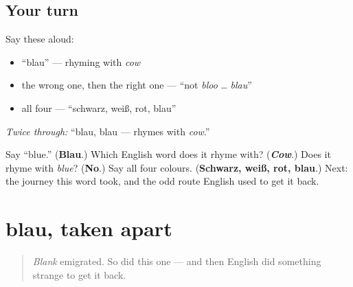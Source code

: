 \subsection*{Your turn}
Say these aloud:

\begin{itemize}
\raggedright
  \item \textquotedblleft{}blau\textquotedblright{} — rhyming with \emph{cow}
  \item the wrong one, then the right one — \textquotedblleft{}not \emph{bloo} … \emph{blau}\textquotedblright{}
  \item all four — \textquotedblleft{}schwarz, weiß, rot, blau\textquotedblright{}
\end{itemize}

\emph{Twice through:} \textquotedblleft{}blau, blau — rhymes with \emph{cow}.\textquotedblright{}

\begin{tcolorbox}[breakable,colback=teal!4,colframe=teal!35!black,title={Before you move on}]
Say \textquotedblleft{}blue.\textquotedblright{} (\textbf{Blau}.) Which English word does it rhyme with? (\emph{\textbf{Cow}}.) Does it rhyme with \emph{blue}? (\textbf{No}.) Say all four colours. (\textbf{Schwarz, weiß, rot, blau}.) Next: the journey this word took, and the odd route English used to get it back.
\end{tcolorbox}
\section[blau, bleu, blue]{blau, taken apart}

\label{lesson:GE-C13-blau-bleu}



\begin{quote}
\emph{Blank} emigrated. So did this one — and then English did something strange to get it back.
\end{quote}

